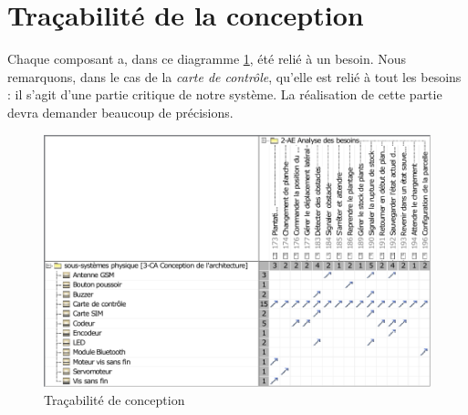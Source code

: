 \section{Traçabilité de la conception}
Chaque composant a, dans ce diagramme \ref{fig:tracabiliteConception}, été relié à un besoin. Nous remarquons, dans le cas de la \emph{carte de contrôle}, qu'elle est relié à tout les besoins : il s'agit d'une partie critique de notre système. La réalisation de cette partie devra demander beaucoup de précisions.
\begin{figure}[!ht]
\centering
\includegraphics[width = \textwidth]{./III/images/Dependency_Matrix_3-CA_Conception_de_l_architecture_Tracabilite_conception.pdf}
\caption{Traçabilité de conception}\label{fig:tracabiliteConception}
\end{figure}
